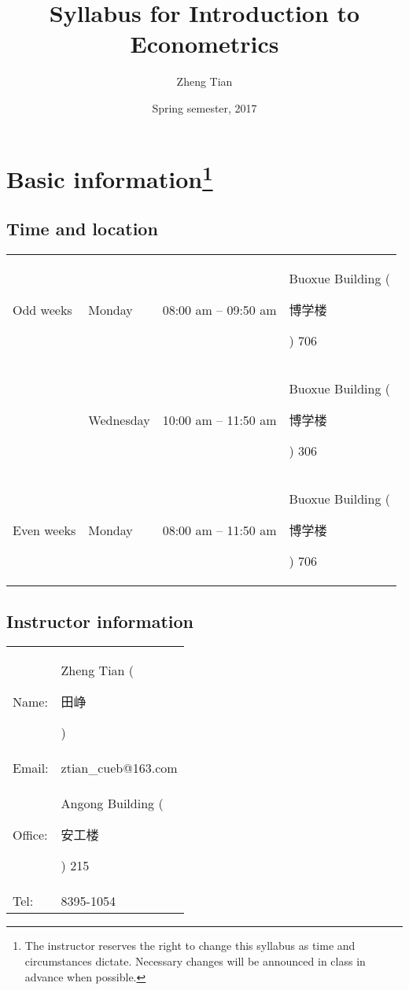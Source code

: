 \documentclass[a4paper,11pt]{article}
\author{Zheng Tian}
\date{Spring semester, 2017}
\title{Syllabus for Introduction to Econometrics}
\begin{document}
\maketitle

\section{Basic information\footnote{The instructor reserves the right to change this syllabus as
time and circumstances dictate. Necessary changes will be announced in
class in advance when possible.}}
\label{sec:org74f12a8}
\subsection*{Time and location}
\label{sec:orgd982353}

\begin{center}
\begin{tabular}{llll}
Odd weeks & Monday & 08:00 am -- 09:50 am & Buoxue Building (\begin{CJK*}{UTF8}{gbsn}博学楼\end{CJK*}) 706\\
 & Wednesday & 10:00 am -- 11:50 am & Buoxue Building (\begin{CJK*}{UTF8}{gbsn}博学楼\end{CJK*}) 306\\
Even weeks & Monday & 08:00 am -- 11:50 am & Buoxue Building (\begin{CJK*}{UTF8}{gbsn}博学楼\end{CJK*}) 706\\
\end{tabular}
\end{center}


\subsection*{Instructor information}
\label{sec:orgf8ced7f}

\begin{center}
\begin{tabular}{ll}
Name: & Zheng Tian (\begin{CJK*}{UTF8}{gbsn}田峥\end{CJK*})\\
Email: & ztian\_cueb@163.com\\
Office: & Angong Building (\begin{CJK*}{UTF8}{gbsn}安工楼\end{CJK*}) 215\\
Tel: & 8395-1054\\
\end{tabular}
\end{center}
\end{document}
